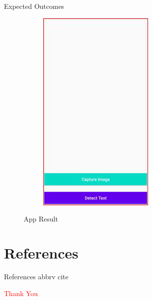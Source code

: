 \documentclass{beamer}
\begin{document}
\begin{frame}[allowframebreaks]{Expected Outcomes}
\begin{figure}
\begin{subfigure}[b]{0.3\linewidth}
			{\includegraphics[width=\linewidth]{App_Result_2}}
			\label{App}
           \end{subfigure}
	\caption{App Result}
	\end{figure}

\end{frame}

\section{References}
\begin{frame}[allowframebreaks]{References}
	 {abbrv}
	 {cite}
\end{frame}

\begin{frame}
	\begin{center}
	\LARGE
	\textcolor{red}{Thank You}
	\end{center}
\end{frame}
\end{document}
